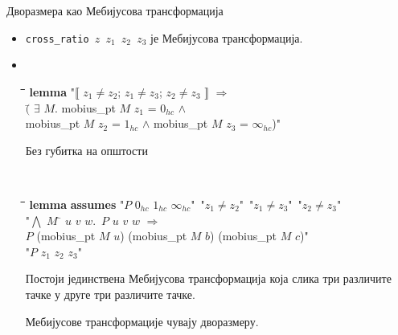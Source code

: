 \documentclass[slidestop, compress, mathserif, containsverbatim, xcolor=dvipsnames]{beamer}
\newcommand{\lbrakk}{\llbracket}
\newcommand{\rbrakk}{\rrbracket}
\begin{document}
\begin{frame}{Дворазмера као Мебијусова трансформација}
  \begin{itemize}
  \item {\tt cross\_ratio $z$ $z_1$ $z_2$ $z_3$} је Мебијусова
    трансформација.
  \item \begin{footnotesize} {\tt
      \begin{tabbing}
        \hspace{5mm}\=\hspace{5mm}\=\hspace{5mm}\=\hspace{5mm}\=\hspace{5mm}\=\kill
        {\bf lemma} "{}$\lbrakk$ $z_1 \neq z_2$; $z_1 \neq z_3$; $z_2 \neq z_3$ $\rbrakk$ $\Longrightarrow$ \\
        \> $($\= $\exists$ $M$. mobius\_pt $M$ $z_1$ = $0_{hc}$ $\wedge$ \\
        \>\> mobius\_pt $M$ $z_2$ = $1_{hc}$ $\wedge$ mobius\_pt $M$ $z_3$ = $\infty_{hc}$)"
      \end{tabbing}
  } \end{footnotesize} 
  \begin{block}{Без губитка на општости}
    \begin{footnotesize} {\tt
        \begin{tabbing}
          \hspace{5mm}\=\hspace{5mm}\=\hspace{5mm}\=\hspace{5mm}\=\hspace{5mm}\=\kill
          {\bf lemma} {\bf assumes} "$P$ $0_{hc}$ $1_{hc}$ $\infty_{hc}$"\ "$z_1 \neq z_2$"\ "$z_1 \neq z_3$"\ "$z_2 \neq z_3$"\\
          \>"{}$\bigwedge$ $M$ \= $u$ $v$ $w$.\ $P$ $u$ $v$ $w$ $\Longrightarrow$ \\
      \>\> $P$ (mobius\_pt $M$ $u$) (mobius\_pt $M$ $b$) (mobius\_pt $M$ $c$)"\\
         "$P$ $z_1$ $z_2$ $z_3$"
        \end{tabbing}
    } \end{footnotesize}
  \end{block}
  \begin{block}{}
     Постоји јединствена Мебијусова трансформација која слика три
     различите тачке у друге три различите тачке.
  \end{block}
  \begin{block}{} 
     Мебијусове трансформације чувају дворазмеру.
  \end{block}
  \end{itemize}
\end{frame}
\end{document}

